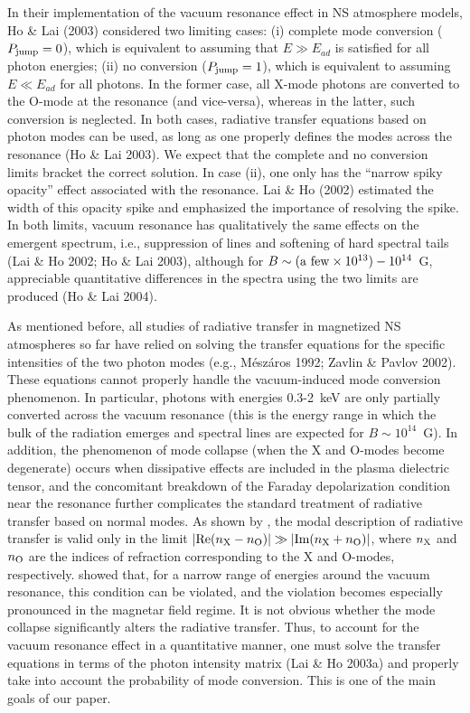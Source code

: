 \documentclass[useAMS,onecolumn,usenatbib,usegraphicx]{mn2e}
\begin{document}
In their implementation of the vacuum resonance effect in NS
atmosphere models, Ho \& Lai (2003) considered two limiting cases: (i)
complete mode conversion ($P_{\rm jump}=0$), which is equivalent to assuming that 
$E\gg
E_{ad}$ is satisfied for all photon energies; (ii) no conversion ($P_{\rm jump}=1$),
which is equivalent to assuming $E\ll E_{ad}$ for all photons. In
the former case, all X-mode photons are converted to the O-mode at the
resonance (and vice-versa), whereas in the latter, such conversion is
neglected. In both cases, radiative transfer equations based on 
photon modes can be used, as long as one properly defines the modes across the
resonance (Ho \& Lai 2003). We expect that the complete and 
no conversion limits bracket the correct solution.
In case (ii), one only has the
``narrow spiky opacity'' effect associated with the resonance.  Lai \&
Ho (2002) estimated the width of this opacity spike and emphasized the
importance of resolving the spike. In both limits, vacuum resonance
has qualitatively the same effects on the emergent spectrum, i.e.,
suppression of lines and softening of hard spectral tails (Lai \& Ho
2002; Ho \& Lai 2003), although for $B\sim ({\rm a~few}\times
10^{13})-10^{14}$~G, appreciable quantitative differences in the 
spectra using the two limits are produced (Ho \& Lai 2004).

As mentioned before, all studies of radiative transfer in magnetized 
NS atmospheres so far have relied on solving the transfer equations for the
specific intensities of the two photon modes (e.g.,
M\'{e}sz\'{a}ros 1992; Zavlin \& Pavlov 2002). These equations cannot properly 
handle the vacuum-induced mode conversion phenomenon. 
In particular, photons with energies 0.3-2~keV are only partially converted across
the vacuum resonance (this is the energy range
in which the bulk of the radiation emerges and spectral lines are
expected for $B\sim 10^{14}$~G). 
In addition, the phenomenon of mode collapse 
(when the X and O-modes become degenerate) occurs when 
dissipative effects are included in the plasma dielectric tensor,
and the concomitant breakdown of the Faraday
depolarization condition near the resonance further complicates the
standard treatment of radiative transfer based on normal modes.
As shown by \citet[][]{GnedinPavlov74a}, the modal description of radiative 
transfer is valid only in the limit 
$|\mbox{Re}(n_{\rm X}-n_{\rm O})|\gg |\mbox{Im}(n_{\rm X}+n_{\rm O})|$, 
where $n_{\rm X}$ and $n_{\rm O}$
are the indices of refraction corresponding to the X and O-modes,
respectively.  \citet[][]{HoLai03a} showed that, for a narrow range of
energies around the vacuum resonance, this condition can be violated,
and the violation becomes especially pronounced in the magnetar field regime.
It is not obvious whether the mode collapse significantly alters the 
radiative transfer. Thus, to account for the vacuum resonance effect 
in a quantitative manner, one must 
solve the transfer equations in terms of the photon intensity matrix 
(Lai \& Ho 2003a) and properly take into account the probability of
mode conversion. This is one of the main goals of our paper.
\end{document}
